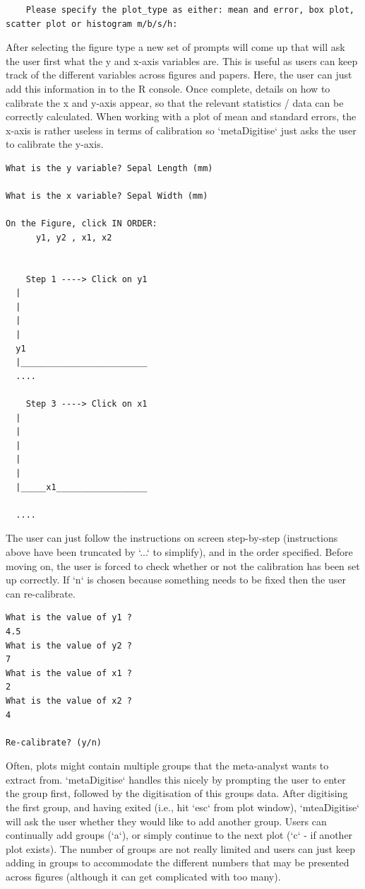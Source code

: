 \documentclass{article}
\begin{document}
\begin{lstlisting}
	Please specify the plot_type as either: mean and error, box plot, scatter plot or histogram m/b/s/h:
\end{lstlisting}

After selecting the figure type a new set of prompts will come up that will ask the user first what the y and x-axis variables are. This is useful as users can keep track of the different variables across figures and papers. Here, the user can just add this information in to the R console. Once complete, details on how to calibrate the x and y-axis appear, so that the relevant statistics / data can be correctly calculated. When working with a plot of mean and standard errors, the x-axis is rather useless in terms of calibration so `metaDigitise` just asks the user to calibrate the y-axis. 

\begin{lstlisting}
What is the y variable? Sepal Length (mm)

What is the x variable? Sepal Width (mm)

On the Figure, click IN ORDER: 
      y1, y2 , x1, x2  


    Step 1 ----> Click on y1
  |
  |
  |
  |
  y1
  |_________________________
  ....

    Step 3 ----> Click on x1
  |
  |
  |
  |
  |
  |_____x1__________________

  ....
 \end{lstlisting}

The user can just follow the instructions on screen step-by-step (instructions above have been truncated by `...` to simplify), and in the order specified. Before moving on, the user is forced to check whether or not the calibration has been set up correctly. If `n` is chosen because something needs to be fixed then the user can re-calibrate.

\begin{lstlisting}
What is the value of y1 ?
4.5
What is the value of y2 ?
7
What is the value of x1 ?
2
What is the value of x2 ?
4

Re-calibrate? (y/n) 
\end{lstlisting}

Often, plots might contain multiple groups that the meta-analyst wants to extract from. `metaDigitise` handles this nicely by prompting the user to enter the group first, followed by the digitisation of this groups data. After digitising the first group, and having exited (i.e., hit `esc` from plot window), `mteaDigitise` will ask the user whether they would like to add another group. Users can continually add groups (`a`), or simply continue to the next plot (`c` - if another plot exists). The number of groups are not really limited and users can just keep adding in groups to accommodate the different numbers that may be presented across figures (although it can get complicated with too many).
\end{document}

